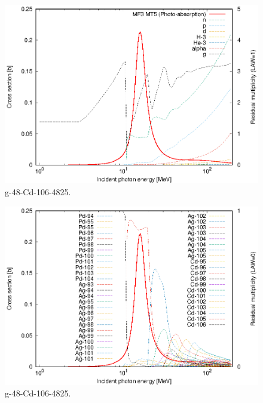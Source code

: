 \begin{figure}
 \includegraphics[width=\linewidth]{eps/g_48-Cd-106_4825.eps}
  \caption{g-48-Cd-106-4825.}
\end{figure}
\begin{figure}
 \includegraphics[width=\linewidth]{eps-law0/g_48-Cd-106_4825.eps}
 \caption{g-48-Cd-106-4825.}
\end{figure}
\newpage \clearpage

